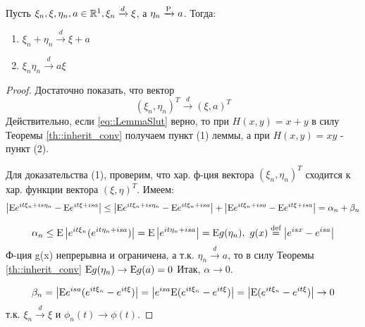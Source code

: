 \newpage
\begin{theorem*}
    Пусть \(\xi_n, \xi, \eta_n, a \in \R^1, \xi_n \xrightarrow{d} \xi\), а \(\eta_n \xrightarrow{\P} a\).
    Тогда:
    \begin{enumerate}
        \item \(\xi_n + \eta_n \xrightarrow{d} \xi + a\)
        \item \(\xi_n \eta_n \xrightarrow{d} a\xi\)
    \end{enumerate}
\end{theorem*}
\begin{proof}
    Достаточно показать, что вектор
    \begin{equation} \label{eq::LemmaSlut}
        (\xi_n, \eta_n)^T \xrightarrow{d} (\xi, a)^T
    \end{equation}
    Действительно, если \eqref{eq::LemmaSlut} верно, то при \(H(x, y) = x + y\) в силу Теоремы \ref{th::inherit_conv} получаем пункт (1) леммы,
    а при \(H(x, y) = xy\) -  пункт (2).

    Для доказательства (1), проверим, что хар. ф-ция
    вектора \((\xi_n, \eta_n)^T\) сходится к хар. функции вектора \((\xi, \eta)^T\).
    Имеем:
    \[\left\lvert\E e^{it\xi_n + is\eta_n} - \E e^{it\xi + isa}\right\rvert \leq \left\lvert \E e^{it\xi_n + is\eta_n} - \E e^{it\xi_n + isa}\right\rvert + \left\lvert \E e^{it\xi_n + isa} - \E e^{it\xi + isa}\right\rvert = \alpha_n + \beta_n\]

    \[\alpha_n \leq \E \left\lvert e^{it\xi_n}(e^{it\eta_n + isa}) \right\rvert  = \E \left\lvert e^{it\eta_n + isa} \right\rvert  = \E g(\eta_n), \ g(x)\defeq\left\lvert e^{isx} - e^{isa} \right\rvert \]
    Ф-ция g(x) непрерывна и ограничена, а т.к. \(\eta_n \xrightarrow{d} a\),
    то в силу Теоремы \ref{th::inherit_conv} \(\E g(\eta_n) \rightarrow \E g(a) = 0\)
    Итак, \(\alpha \rightarrow 0\).

    \[\beta_n = \left\lvert \E e^{isa}(e^{it\xi_n} - e^{it\xi}) \right\rvert  = \left\lvert e^{isa} \E (e^{it\xi_n} - e^{it\xi}) \right\rvert  = \left\lvert \E (e^{it\xi_n} - e^{it\xi}) \right\rvert  \rightarrow 0\]
    т.к. \(\xi_n \xrightarrow{d} \xi\) и \(\phi_n(t) \rightarrow \phi(t)\).
\end{proof}

